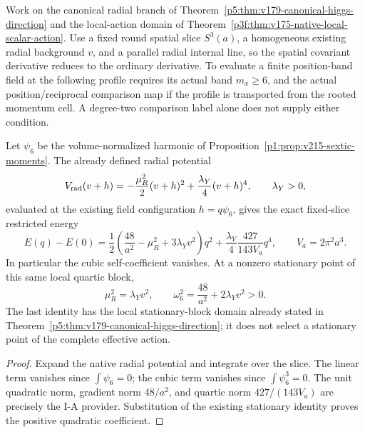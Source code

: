 \documentclass[12pt,a4paper]{article}
\begin{document}

\begin{proposition}
\label{p5:prop:v215-sextic-radial-evaluation}
Work on the canonical radial branch of
Theorem~\ref{p5:thm:v179-canonical-higgs-direction} and the local-action
domain of Theorem~\ref{p3f:thm:v175-native-local-scalar-action}. Use a
fixed round spatial slice \(S^3(a)\), a homogeneous existing radial
background \(v\), and a parallel radial internal line, so the spatial
covariant derivative reduces to the ordinary derivative. To evaluate a
finite position-band field at the following profile requires its actual
band \(m_x\geq6\), and the actual position/reciprocal comparison map if
the profile is transported from the rooted momentum cell. A degree-two
comparison label alone does not supply either condition.

Let \(\psi_6\) be the volume-normalized harmonic of
Proposition~\ref{p1:prop:v215-sextic-moments}. The already defined radial
potential
\[
 V_{\rm rad}(v+h)=-\frac{\mu_R^2}{2}(v+h)^2
                         +\frac{\lambda_Y}{4}(v+h)^4,
 \qquad\lambda_Y>0,
\]
evaluated at the existing field configuration \(h=q\psi_6\), gives
the exact fixed-slice restricted energy
\[
 E(q)-E(0)=
 \frac12\left(\frac{48}{a^2}-\mu_R^2+3\lambda_Yv^2\right)q^2
 +\frac{\lambda_Y}{4}\frac{427}{143V_a}q^4,
 \qquad V_a=2\pi^2a^3.
\]
In particular the cubic self-coefficient vanishes. At a nonzero
stationary point of this same local quartic block,
\[
 \mu_R^2=\lambda_Yv^2,\qquad
 \omega_6^2=\frac{48}{a^2}+2\lambda_Yv^2>0.
\]
The last identity has the local stationary-block domain already stated
in Theorem~\ref{p5:thm:v179-canonical-higgs-direction}; it does not select
a stationary point of the complete effective action.
\end{proposition}
\begin{proof}
Expand the native radial potential and integrate over the slice. The
linear term vanishes since \(\int\psi_6=0\); the cubic term vanishes
since \(\int\psi_6^3=0\). The unit quadratic norm, gradient norm
\(48/a^2\), and quartic norm \(427/(143V_a)\) are precisely the
I-A provider. Substitution of the existing stationary identity proves
the positive quadratic coefficient.
\end{proof}
\end{document}
